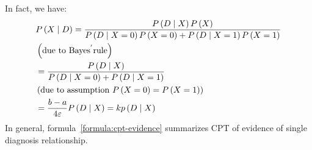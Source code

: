 \documentclass{article}
\numberwithin{equation}{section}
\numberwithin{figure}{section}
\numberwithin{table}{section}
\begin{document}
In fact, we have:
\begin{align*}
&P\left(X\mathrel{\left|\vphantom{X D}\right.\kern-\nulldelimiterspace}D\right)=\frac{P\left(D\mathrel{\left|\vphantom{D X}\right.\kern-\nulldelimiterspace}X\right)P\left(X\right)}{P\left(D\mathrel{\left|\vphantom{D X=0}\right.\kern-\nulldelimiterspace}X=0\right)P\left(X=0\right)+P\left(D\mathrel{\left|\vphantom{D X=1}\right.\kern-\nulldelimiterspace}X=1\right)P\left(X=1\right)}\\
&\left(\mathrm{due\ to\ Baye}{\mathrm{s}}^{\mathrm{'}}\mathrm{rule}\right)\\ 
&=\frac{P\left(D\mathrel{\left|\vphantom{D X}\right.\kern-\nulldelimiterspace}X\right)}{P\left(D\mathrel{\left|\vphantom{D X=0}\right.\kern-\nulldelimiterspace}X=0\right)+P\left(D\mathrel{\left|\vphantom{D X=1}\right.\kern-\nulldelimiterspace}X=1\right)}\\
&\left(\mathrm{due\ to}\ \mathrm{assumption}\ P\left(X=0\right)=P\left(X=1\right)\right)\\ 
&=\frac{b-a}{4\varepsilon }P\left(D\mathrel{\left|\vphantom{D X}\right.\kern-\nulldelimiterspace}X\right)=kp\left(D\mathrel{\left|\vphantom{D X}\right.\kern-\nulldelimiterspace}X\right)
\end{align*}
In general, formula~\ref{formula:cpt-evidence} summarizes CPT of evidence of single diagnosis relationship.
\end{document}
